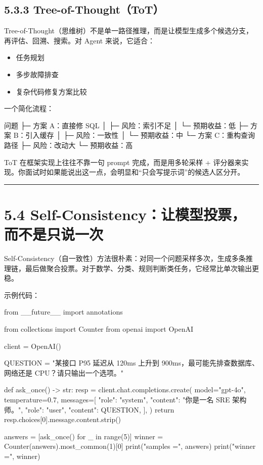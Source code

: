 \subsection{5.3.3 Tree-of-Thought（ToT）}

Tree-of-Thought（思维树）不是单一路径推理，而是让模型生成多个候选分支，再评估、回溯、搜索。对 Agent 来说，它适合：


\begin{itemize}[leftmargin=2em]
\item 任务规划
\item 多步故障排查
\item 复杂代码修复方案比较
\end{itemize}

一个简化流程：


\begin{codeblock}
问题
 ├─ 方案 A：直接修 SQL
 │   ├─ 风险：索引不足
 │   └─ 预期收益：低
 ├─ 方案 B：引入缓存
 │   ├─ 风险：一致性
 │   └─ 预期收益：中
 └─ 方案 C：重构查询路径
     ├─ 风险：改动大
     └─ 预期收益：高
\end{codeblock}

ToT 在框架实现上往往不靠一句 prompt 完成，而是用多轮采样 + 评分器来实现。你面试时如果能说出这一点，会明显和``只会写提示词''的候选人区分开。


\bigskip\hrule\bigskip

\section{5.4 Self-Consistency：让模型投票，而不是只说一次}

Self-Consistency（自一致性）方法很朴素：对同一个问题采样多次，生成多条推理链，最后做聚合投票。对于数学、分类、规则判断类任务，它经常比单次输出更稳。


示例代码：


\begin{codeblock}
from __future__ import annotations

from collections import Counter
from openai import OpenAI

client = OpenAI()

QUESTION = "某接口 P95 延迟从 120ms 上升到 900ms，最可能先排查数据库、网络还是 CPU？请只输出一个选项。"


def ask_once() -> str:
    resp = client.chat.completions.create(
        model="gpt-4o",
        temperature=0.7,
        messages=[
            {"role": "system", "content": "你是一名 SRE 架构师。"},
            {"role": "user", "content": QUESTION},
        ],
    )
    return resp.choices[0].message.content.strip()


answers = [ask_once() for _ in range(5)]
winner = Counter(answers).most_common(1)[0]
print("samples =", answers)
print("winner =", winner)
\end{codeblock}

